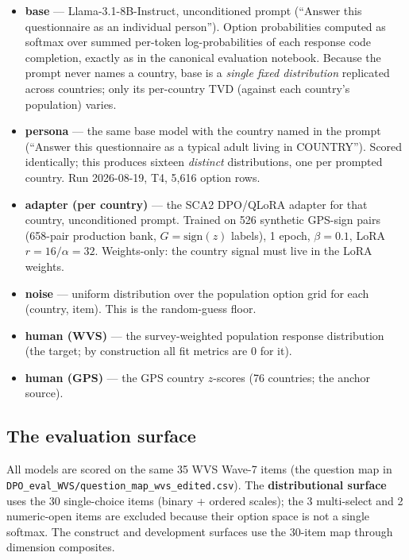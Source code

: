 \documentclass[11pt]{article}
\begin{document}
\begin{itemize}
\item \textbf{base} --- Llama-3.1-8B-Instruct, unconditioned prompt (``Answer this questionnaire as an individual person''). Option probabilities computed as softmax over summed per-token log-probabilities of each response code completion, exactly as in the canonical evaluation notebook. Because the prompt never names a country, base is a \emph{single fixed distribution} replicated across countries; only its per-country TVD (against each country's population) varies.
\item \textbf{persona} --- the same base model with the country named in the prompt (``Answer this questionnaire as a typical adult living in COUNTRY''). Scored identically; this produces sixteen \emph{distinct} distributions, one per prompted country. Run 2026-08-19, T4, 5{,}616 option rows.
\item \textbf{adapter (per country)} --- the SCA2 DPO/QLoRA adapter for that country, unconditioned prompt. Trained on 526 synthetic GPS-sign pairs (658-pair production bank, $G=\mathrm{sign}(z)$ labels), 1 epoch, $\beta=0.1$, LoRA $r{=}16/\alpha{=}32$. Weights-only: the country signal must live in the LoRA weights.
\item \textbf{noise} --- uniform distribution over the population option grid for each (country, item). This is the random-guess floor.
\item \textbf{human (WVS)} --- the survey-weighted population response distribution (the target; by construction all fit metrics are 0 for it).
\item \textbf{human (GPS)} --- the GPS country $z$-scores (76 countries; the anchor source).
\end{itemize}

\subsection{The evaluation surface}
\label{sec:surface}
All models are scored on the same 35 WVS Wave-7 items (the question map in \texttt{DPO\_eval\_WVS/question\_map\_wvs\_edited.csv}). The \textbf{distributional surface} uses the 30 single-choice items (binary + ordered scales); the 3 multi-select and 2 numeric-open items are excluded because their option space is not a single softmax. The construct and development surfaces use the 30-item map through dimension composites.
\end{document}
